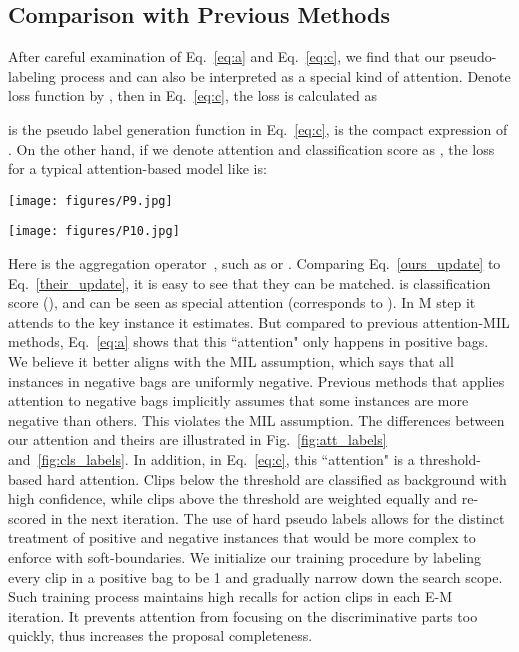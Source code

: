 \documentclass[runningheads]{llncs}
\begin{document}
\subsection{Comparison with Previous Methods}\label{Compare}
After careful examination of Eq.~\ref{eq:a} and Eq.~\ref{eq:c}, we find that our pseudo-labeling process  and  can also be interpreted as a special kind of attention. Denote loss function by , then in Eq.~\ref{eq:c}, the loss is calculated as
  


\smallskip
 is the pseudo label generation function in Eq.~\ref{eq:c},  is the compact expression of . On the other hand, if we denote attention and classification score as , the loss for a typical attention-based model like \cite{wang2017untrimmednets} is:
  

\begin{figure*} [t]
    \centering
    \texttt{[image: figures/P9.jpg]}
    \caption{In our EM-MIL model only the foreground classification score  affects the key instance pseudo label  (left), while in previous models all-class classification scores contribute to the attention weights (right).}
    \label{fig:att_labels}
    
    \texttt{[image: figures/P10.jpg]}
    \caption{Our EM-MIL model (left) uses key instance assignment  to generate pseudo classification labels  only for the foreground classes, while in previous models such as UntrimmedNet (right) attentions are applied to all classes.}
    \label{fig:cls_labels}
    
\end{figure*}

\smallskip
Here  is the aggregation operator~\cite{ilse2018attention}, such as  or . Comparing Eq.~\ref{ours_update} to Eq.~\ref{their_update}, it is easy to see that they can be matched.  is classification score (), and  can be seen as special attention (corresponds to ). In M step it attends to the key instance it estimates. But compared to previous attention-MIL methods, Eq.~\ref{eq:a} shows that this ``attention" only happens in positive bags. We believe it better aligns with the MIL assumption, which says that all instances in negative bags are uniformly negative. Previous methods that applies attention to negative bags implicitly assumes that some instances are more negative than others. This violates the MIL assumption. The differences between our attention and theirs are illustrated in Fig.~\ref{fig:att_labels} and~\ref{fig:cls_labels}. In addition, in Eq.~\ref{eq:c}, this ``attention" is a threshold-based hard attention. Clips below the threshold are classified as background with high confidence, while clips above the threshold are weighted equally and re-scored in the next iteration. The use of hard pseudo labels allows for the distinct treatment of positive and negative instances that would be more complex to enforce with soft-boundaries. We initialize our training procedure by labeling every clip in a positive bag to be 1 and gradually narrow down the search scope. Such training process maintains high recalls for action clips in each E-M iteration. It prevents attention from focusing on the discriminative parts too quickly, thus increases the proposal completeness. 
\end{document}
